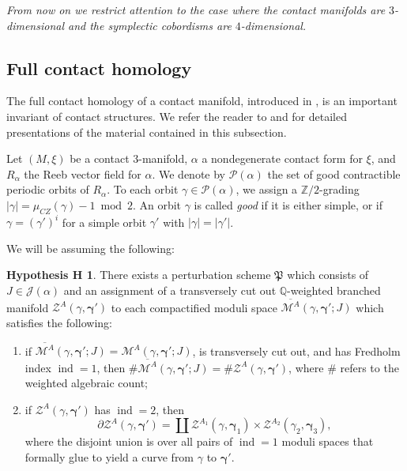 \documentclass[JEP,XML,SOM,Unicode,NoFloatCountersInSection]{cedram}
\let\mathcal\mathscr
\theoremstyle{plain}
\theoremstyle{definition}
\newtheorem*{hypH}{Hypothesis H}
\numberwithin{equation}{subsection}
\newcommand{\QQ}{\mathbb{Q}}
\newcommand{\bdry}{\partial}
\let\op\operatorname
\let\bs\boldsymbol
\newcommand{\be}{\begin{enumerate}}
\newcommand{\ee}{\end{enumerate}}
\begin{document}
{\em From now on we restrict attention to the case where the contact manifolds are $3$-dimensional and the symplectic cobordisms are $4$-dimensional.}

\subsection{Full contact homology} \label{sec3.2.1}

The full contact homology of a contact manifold, introduced in \cite{SFT}, is an important invariant of contact structures. We refer the reader to \cite{SFT} and \cite{B} for detailed presentations of the material contained in this subsection.

Let $(M,\xi)$ be a contact $3$-manifold, $\alpha$ a nondegenerate contact form for $\xi$, and $R_\alpha$ the Reeb vector field for $\alpha$. We denote by $\mathcal{P}(\alpha)$ the set of good contractible periodic orbits of $R_\alpha$. To each orbit $\gamma \in \mathcal{P}(\alpha)$, we assign a $\mathbb{Z}/2$-grading $|\gamma| = \mu_{CZ}(\gamma) -1\bmod2$. An orbit $\gamma$ is called {\em good} if it is either simple, or if $\gamma = (\gamma')^i$ for a simple orbit $\gamma'$ with $ |\gamma|=|\gamma'|$.

We will be assuming the following:

\begin{hypH}
There exists a perturbation scheme ${\mathfrak P}$ which consists of $J\in \mathcal{J}(\alpha)$ and an assignment of a transversely cut out $\QQ$-weighted branched manifold $\mathcal{Z}^A(\gamma,\bs\gamma')$ to each compactified moduli space $\overline{\mathcal{M}^A}(\gamma,\bs\gamma';J)$ which satisfies the following:
\be
\item if $\overline{\mathcal{M}^A}(\gamma,\bs\gamma';J)=\mathcal{M}^A(\gamma,\bs\gamma';J)$, is transversely cut out, and has Fredholm index $\op{ind}=1$, then $\# \overline{\mathcal{M}^A}(\gamma,\bs\gamma';J)=\#\mathcal{Z}^A(\gamma,\bs\gamma')$, where $\#$ refers to the weighted algebraic count;
\item if $\mathcal{Z}^A(\gamma,\bs\gamma')$ has $\op{ind}=2$, then
$$\bdry\mathcal{Z}^A(\gamma,\bs\gamma')=\coprod\mathcal{Z}^{A_1}(\gamma,\bs\gamma_1) \times \mathcal{Z}^{A_2}(\gamma_2,\bs\gamma_3),$$
where the disjoint union is over all pairs of $\op{ind}=1$ moduli spaces that formally glue to yield a curve from $\gamma$ to $\bs\gamma'$.
\ee
\end{hypH}
\end{document}
